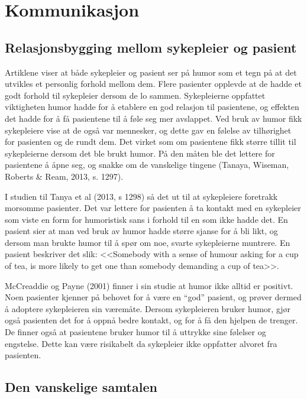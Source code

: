 \section{Kommunikasjon}

\subsection{Relasjonsbygging mellom sykepleier og pasient}

Artiklene viser at både sykepleier og pasient ser på humor som et tegn på at
det utvikles et personlig forhold mellom dem. Flere pasienter opplevde at de
hadde et godt forhold til sykepleier dersom de lo sammen. Sykepleierne
oppfattet viktigheten humor hadde for å etablere en god relasjon til
pasientene, og effekten det hadde for å få pasientene til å føle seg mer
avslappet. Ved bruk av humor fikk sykepleiere vise at de også var mennesker, og
dette gav en følelse av tilhørighet for pasienten og de rundt dem. Det virket
som om pasientene fikk større tillit til sykepleierne dersom det ble brukt
humor. På den måten ble det lettere for pasientene å åpne seg, og snakke om de
vanskelige tingene (Tanaya, Wiseman, Roberts \&{} Ream, 2013, s. 1297). 

I studien til Tanya et al (2013, s 1298)  så det ut til at sykepleiere
foretrakk morsomme pasienter. Det var lettere for pasienten å ta kontakt med en
sykepleier som  viste en form for humoristisk sans i forhold til en som ikke
hadde det.  En pasient sier at man ved bruk av humor hadde større sjanse for å
bli likt, og dersom man brukte humor til å spør om noe, svarte sykepleierne
muntrere.  En pasient beskriver det slik: <<Somebody with a sense of humour
asking for a cup of tea, is more likely to get one than somebody demanding a
cup of tea>>.

McCreaddie og Payne (2001) finner i sin studie at humor ikke alltid er
positivt. Noen pasienter kjenner på behovet for å være en “god” pasient, og
prøver dermed å adoptere sykepleieren sin væremåte. Dersom sykepleieren bruker
humor, gjør også pasienten det for å oppnå bedre kontakt, og for å få den
hjelpen de trenger.  De finner også at pasientene bruker humor til å uttrykke
sine følelser og engstelse. Dette kan være risikabelt da sykepleier ikke
oppfatter alvoret fra pasienten. 

\subsection{Den vanskelige samtalen}

